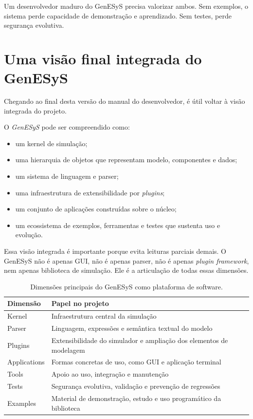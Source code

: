 Um desenvolvedor maduro do GenESyS precisa valorizar ambos. Sem exemplos, o sistema perde capacidade de demonstração e aprendizado. Sem testes, perde segurança evolutiva.

\section{Uma visão final integrada do GenESyS}
\label{sec:cap10_visao_final_integrada_genesys}

Chegando ao final desta versão do manual do desenvolvedor, é útil voltar à visão integrada do projeto.

O \textit{GenESyS} pode ser compreendido como:

\begin{itemize}
    \item um kernel de simulação;
    \item uma hierarquia de objetos que representam modelo, componentes e dados;
    \item um sistema de linguagem e parser;
    \item uma infraestrutura de extensibilidade por \textit{plugins};
    \item um conjunto de aplicações construídas sobre o núcleo;
    \item um ecossistema de exemplos, ferramentas e testes que sustenta uso e evolução.
\end{itemize}

Essa visão integrada é importante porque evita leituras parciais demais. O GenESyS não é apenas GUI, não é apenas parser, não é apenas \textit{plugin framework}, nem apenas biblioteca de simulação. Ele é a articulação de todas essas dimensões.

\begin{table}[htbp]
    \centering
    \caption{Dimensões principais do GenESyS como plataforma de software.}
    \label{tab:cap10_dimensoes_principais_genesys}
    \small
    \begin{tabular}{|p{3.8cm}|p{7.4cm}|}
        \hline
        \textbf{Dimensão} & \textbf{Papel no projeto} \\
        \hline
        Kernel & Infraestrutura central da simulação \\
        \hline
        Parser & Linguagem, expressões e semântica textual do modelo \\
        \hline
        Plugins & Extensibilidade do simulador e ampliação dos elementos de modelagem \\
        \hline
        Applications & Formas concretas de uso, como GUI e aplicação terminal \\
        \hline
        Tools & Apoio ao uso, integração e manutenção \\
        \hline
        Tests & Segurança evolutiva, validação e prevenção de regressões \\
        \hline
        Examples & Material de demonstração, estudo e uso programático da biblioteca \\
        \hline
    \end{tabular}
\end{table}

